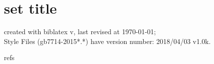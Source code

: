 \documentclass[twoside]{article}
\makeatletter
\def\versionofgbtstyle{2018/04/03 v1.0k}
\def\versionofbiblatex{\abx@version}
\makeatother
\begin{document}
    \section{set title}
    created with biblatex v\versionofbiblatex, last revised at \today;\\ \hspace*{1.5em} Style Files (gb7714-2015*.*) have version number: \versionofgbtstyle.

	refs\nocite{*}

    \printbibliography

    
\end{document}

